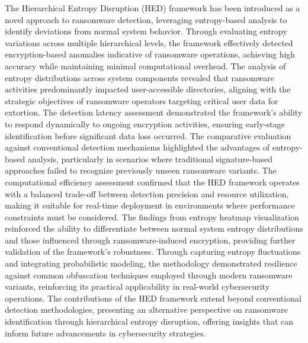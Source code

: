\documentclass[lettersize,journal]{IEEEtran}
\begin{document}
The Hierarchical Entropy Disruption (HED) framework has been introduced as a novel approach to ransomware detection, leveraging entropy-based analysis to identify deviations from normal system behavior. Through evaluating entropy variations across multiple hierarchical levels, the framework effectively detected encryption-based anomalies indicative of ransomware operations, achieving high accuracy while maintaining minimal computational overhead. The analysis of entropy distributions across system components revealed that ransomware activities predominantly impacted user-accessible directories, aligning with the strategic objectives of ransomware operators targeting critical user data for extortion. The detection latency assessment demonstrated the framework’s ability to respond dynamically to ongoing encryption activities, ensuring early-stage identification before significant data loss occurred. The comparative evaluation against conventional detection mechanisms highlighted the advantages of entropy-based analysis, particularly in scenarios where traditional signature-based approaches failed to recognize previously unseen ransomware variants. The computational efficiency assessment confirmed that the HED framework operates with a balanced trade-off between detection precision and resource utilization, making it suitable for real-time deployment in environments where performance constraints must be considered. The findings from entropy heatmap visualization reinforced the ability to differentiate between normal system entropy distributions and those influenced through ransomware-induced encryption, providing further validation of the framework’s robustness. Through capturing entropy fluctuations and integrating probabilistic modeling, the methodology demonstrated resilience against common obfuscation techniques employed through modern ransomware variants, reinforcing its practical applicability in real-world cybersecurity operations. The contributions of the HED framework extend beyond conventional detection methodologies, presenting an alternative perspective on ransomware identification through hierarchical entropy disruption, offering insights that can inform future advancements in cybersecurity strategies.




\end{document}
